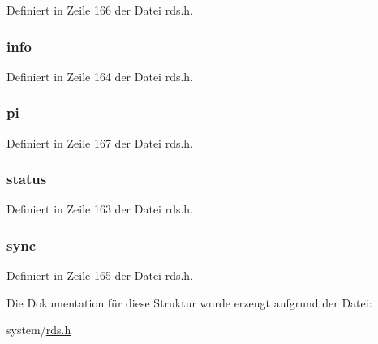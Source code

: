 Definiert in Zeile 166 der Datei rds.\+h.

\hypertarget{structrds_a8936b68dc62d34c0bd4298d71e811a89}{}
\subsubsection[{info}]{ {\bf info}}\label{structrds_a8936b68dc62d34c0bd4298d71e811a89}


Definiert in Zeile 164 der Datei rds.\+h.

\hypertarget{structrds_a157b53b7e71fcc6afe0a4c664d7adb60}{}
\subsubsection[{pi}]{ {\bf pi}}\label{structrds_a157b53b7e71fcc6afe0a4c664d7adb60}


Definiert in Zeile 167 der Datei rds.\+h.

\hypertarget{structrds_a1025e6cbbd3179d2d91b9b4afb8f8efc}{}
\subsubsection[{status}]{ {\bf status}}\label{structrds_a1025e6cbbd3179d2d91b9b4afb8f8efc}


Definiert in Zeile 163 der Datei rds.\+h.

\hypertarget{structrds_aa779e41fc5dcd8e1471033612c290b23}{}
\subsubsection[{sync}]{ {\bf sync}}\label{structrds_aa779e41fc5dcd8e1471033612c290b23}


Definiert in Zeile 165 der Datei rds.\+h.



Die Dokumentation für diese Struktur wurde erzeugt aufgrund der Datei\+:\begin{DoxyCompactItemize}
\item 
system/\hyperlink{rds_8h}{rds.\+h}\end{DoxyCompactItemize}
